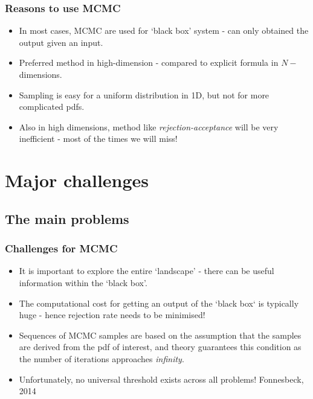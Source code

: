 \documentclass[10pt]{beamer}
\begin{document}
\begin{frame}
	\frametitle{Reasons to use MCMC}
	\begin{itemize}
		\item In most cases, MCMC are used for `black box' system - can only obtained the output given an input.
		\item Preferred method in high-dimension - compared to explicit formula in $N-$dimensions.
		\item Sampling is easy for a uniform distribution in 1D, but not for more complicated pdfs.
		\item Also in high dimensions, method like \textit{rejection-acceptance} will be very inefficient - most of the times we will miss!
	\end{itemize}
\end{frame}

\section{Major challenges}
\subsection{The main problems}

\begin{frame}
	\frametitle{Challenges for MCMC}
	\begin{itemize}
		\item It is important to explore the entire `landscape' - there can be useful information within the `black box'.
		\item The computational cost for getting an output of the `black box` is typically huge - hence rejection rate needs to be minimised!
		\item Sequences of MCMC samples are based on the assumption that the samples are derived from the pdf of interest, and theory guarantees this condition as the number of iterations approaches \textit{infinity}.
		\item Unfortunately, no universal threshold exists across all problems! \tiny{Fonnesbeck, 2014}
	\end{itemize}
\end{frame}
\end{document}
